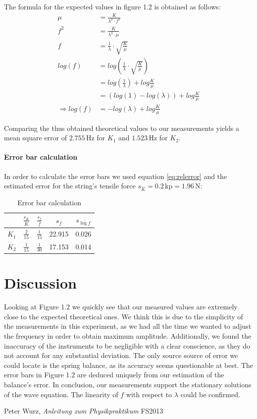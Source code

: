 \documentclass{scrreprt}
\newcommand{\unit}[1]{\ensuremath{\, \mathrm{#1}}}
\begin{document}
The formula for the expected values in figure 1.2 is obtained as follows:
\begin{align}
\mu &= \frac{K}{\lambda^2 \cdot f^2}\\
f^2 &= \frac{K}{\lambda^2\cdot\mu}\\
f &= \frac{1}{\lambda}\cdot\sqrt{\frac{K}{\mu}}\\
log(f) &= log\left(\frac{1}{\lambda}\cdot\sqrt{\frac{K}{\mu}}\right)\\
&=log\left(\frac{1}{\lambda}\right) + log\frac{K}{\mu}\\
&=\left(log(1) - log(\lambda)\right) + log\frac{K}{\mu}\\
\Rightarrow log(f) &=-log(\lambda) + log\frac{K}{\mu}
\end{align}

Comparing the thus obtained theoretical values to our measurements yields a mean square error of $2.755\unit{Hz}$ for $K_1$ and $1.523\unit{Hz}$ for $K_2$.

\paragraph*{Error bar calculation} In order to calculate the error bars we used equation \ref{eq:relerror} and the estimated error for the string's tensile force $s_{\overline{K}}=0.2 \unit{kp} = 1.96 \unit{N}$:

\begin{table}[H]
\center
\begin{tabular}{|c|cccc|}
\cline{2-5}
\multicolumn{1}{c|}{}& \tiny$\frac{s_{\overline{K}}}{\overline{K}}$ & \tiny$\frac{s_{\bar{f}}}{\bar{f}}$ & $s_{\bar{f}}$ & $s_{\overline{\log{f}}}$\\ \hline
$K_1$ & \small$\frac{2}{15}$ & \small$\frac{1}{15}$ & 22.915 & 0.026 \\ \hline
$K_2$ & \small$\frac{1}{15}$ & \small$\frac{1}{30}$ & 17.153 & 0.014 \\ \hline
\end{tabular}
\caption{Error bar calculation}
\end{table}

\section{Discussion}
Looking at Figure 1.2 we quickly see that our measured values are extremely close to the expected theoretical ones. We think this is due to the simplicity of the measurements in this experiment, as we had all the time we wanted to adjust the frequency in order to obtain maximum amplitude. Additionally, we found the inaccuracy of the instruments to be negligible with a clear conscience, as they do not account for any substantial deviation. The only source source of error we could locate is the spring balance, as its accuracy seems questionable at best. The error bars in Figure 1.2 are deduced uniquely from our estimation of the balance's error.\newline
In conclusion, our measurements support the stationary solutions of the wave equation. The linearity of $f$ with respect to $\lambda$ could be confirmed.

\begin{thebibliography}{9}

  Peter Wurz,
  \emph{Anleitung zum Physikpraktikum}
  FS2013

\end{thebibliography}
\end{document}
